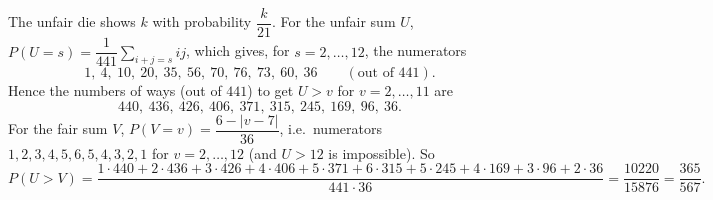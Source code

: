 The unfair die shows $k$ with probability $\dfrac{k}{21}$. For the unfair sum $U$, $P(U=s)=\dfrac{1}{441}\sum_{i+j=s}ij$, which gives, for $s=2,\dots,12$, the numerators
\[
1,\ 4,\ 10,\ 20,\ 35,\ 56,\ 70,\ 76,\ 73,\ 60,\ 36\qquad(\text{out of }441).
\]
Hence the numbers of ways (out of $441$) to get $U>v$ for $v=2,\dots,11$ are
\[
440,\ 436,\ 426,\ 406,\ 371,\ 315,\ 245,\ 169,\ 96,\ 36 .
\]
For the fair sum $V$, $P(V=v)=\dfrac{6-|v-7|}{36}$, i.e.\ numerators $1,2,3,4,5,6,5,4,3,2,1$ for $v=2,\dots,12$ (and $U>12$ is impossible). So
\[
P(U>V)=\dfrac{1\cdot440+2\cdot436+3\cdot426+4\cdot406+5\cdot371+6\cdot315+5\cdot245+4\cdot169+3\cdot96+2\cdot36}{441\cdot36}=\dfrac{10220}{15876}=\boxed{\dfrac{365}{567}}.
\]
